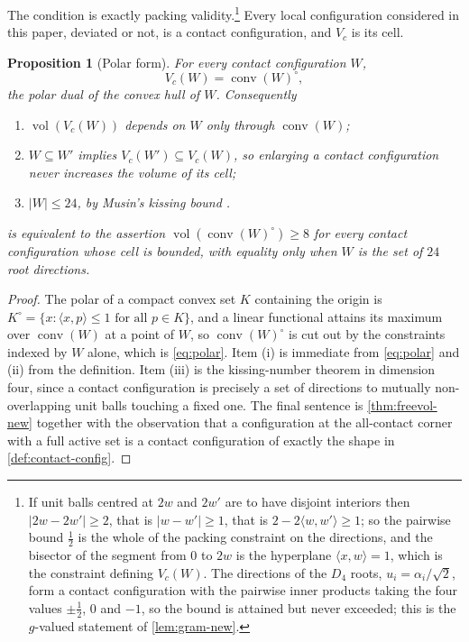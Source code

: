 \documentclass[11pt,reqno]{amsart}
\renewcommand{\_}{\origunderscore\allowbreak}
\numberwithin{equation}{section}
\theoremstyle{plain}
\newtheorem{prop}[thm]{Proposition}
\theoremstyle{definition}
\theoremstyle{remark}
\newcommand{\base}{u}                        %
\DeclareMathOperator{\vol}{vol}
\DeclareMathOperator{\conv}{conv}
\begin{document}
The condition is exactly packing validity.\footnote{If unit balls
centred at $2w$ and $2w'$ are to have disjoint interiors then
$|2w-2w'|\ge2$, that is $|w-w'|\ge1$, that is
$2-2\langle w,w'\rangle\ge1$; so the pairwise bound $\tfrac12$ is the
whole of the packing constraint on the directions, and the bisector of
the segment from $0$ to $2w$ is the hyperplane $\langle x,w\rangle=1$,
which is the constraint defining $V_c(W)$. The directions of the $D_4$
roots, $\base_i=\alpha_i/\sqrt2$, form a contact configuration with the
pairwise inner products taking the four values $\pm\tfrac12$, $0$ and
$-1$, so the bound is attained but never exceeded; this is the
$g$-valued statement of \cref{lem:gram-new}.} Every local configuration
considered in this paper, deviated or not, is a contact configuration,
and $V_c$ is its cell.

\begin{prop}[Polar form]\label{prop:polar-form}
For every contact configuration $W$,
\begin{equation}\label{eq:polar}
  V_c(W)=\conv(W)^{\circ},
\end{equation}
the polar dual of the convex hull of $W$. Consequently
\begin{enumerate}[label=\textup{(\roman*)},leftmargin=2.2em]
\item $\vol(V_c(W))$ depends on $W$ only through $\conv(W)$;
\item $W\subseteq W'$ implies $V_c(W')\subseteq V_c(W)$, so enlarging a
contact configuration never increases the volume of its cell;
\item $|W|\le24$, by Musin's kissing bound \cite{Mus08}.
\end{enumerate}
 is equivalent to the assertion
$\vol(\conv(W)^{\circ})\ge8$ for every contact configuration whose cell
is bounded, with equality only when $W$ is the set of $24$ root
directions.
\end{prop}

\begin{proof}
The polar of a compact convex set $K$ containing the origin is
$K^{\circ}=\{x:\langle x,p\rangle\le1\text{ for all }p\in K\}$, and a
linear functional attains its maximum over $\conv(W)$ at a point of $W$,
so $\conv(W)^{\circ}$ is cut out by the constraints indexed by $W$
alone, which is \eqref{eq:polar}. Item (i) is immediate from
\eqref{eq:polar} and (ii) from the definition. Item (iii) is the
kissing-number theorem in dimension four, since a contact configuration
is precisely a set of directions to mutually non-overlapping unit balls
touching a fixed one. The final sentence is
\cref{thm:freevol-new} together with the observation that a
configuration at the all-contact corner with a full active set is a
contact configuration of exactly the shape in
\cref{def:contact-config}.
\end{proof}
\end{document}
